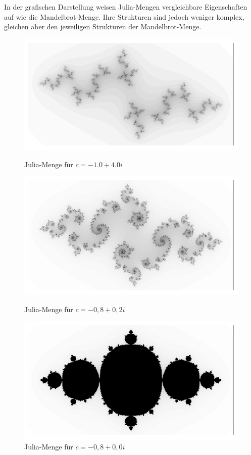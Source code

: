 \noindent
In der grafischen Darstellung weisen Julia-Mengen vergleichbare Eigenschaften
auf wie die Mandelbrot-Menge. Ihre Strukturen sind jedoch weniger komplex,
gleichen aber den jeweiligen Strukturen der Mandelbrot-Menge.

\hfill \break
\newline

\begin{figure}[!htb]
  \includegraphics[width=\linewidth]{img/Julia -1.0+0.4i.pdf}
  \caption{\newline Julia-Menge für \newline $c=-1.0+4.0i$}\label{fig:julia-menge-1}
  \endminipage\hfill
  \includegraphics[width=\linewidth]{img/Julia -0.8+0.2i.pdf}
  \caption{\newline Julia-Menge für \newline  $c = -0,8 + 0,2i$}\label{fig:julia-menge-2}
  \endminipage\hfill
  \includegraphics[width=\linewidth]{img/Julia -0.8+0.0i.pdf}
  \caption{\newline Julia-Menge für \newline  $c = -0,8 + 0,0i$}\label{fig:julia-menge-3}
  \endminipage
\end{figure}